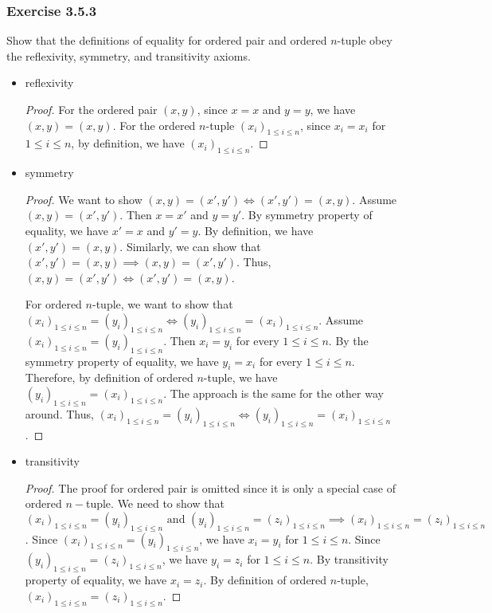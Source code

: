 \documentclass[12pt, letter]{article}
\begin{document}
\subsubsection*{Exercise 3.5.3}
Show that the definitions of equality for ordered pair and ordered $n$-tuple obey the reflexivity, symmetry, and transitivity axioms.
\begin{itemize}
    \item reflexivity
    \begin{proof}
        For the ordered pair $(x,y)$, since $x=x$ and $y=y$, we have $(x,y)=(x,y)$. 
        For the ordered $n$-tuple $(x_i)_{1\leq i\leq n}$, since $x_i=x_i$ for $1\leq i\leq n$, by definition, we have $(x_i)_{1\leq i\leq n}$.     
    \end{proof}  
    \item symmetry
    \begin{proof}
        We want to show $(x,y)=(x',y')\iff (x',y')=(x,y)$. Assume $(x,y)=(x',y')$. Then $x=x'$ and $y=y'$. By symmetry property of equality, we have 
        $x'=x$ and $y'=y$. By definition, we have $(x',y')=(x,y)$. Similarly, we can show that $(x',y')=(x,y)\implies (x,y)=(x',y')$.
        Thus, $(x,y)=(x',y')\iff (x',y')=(x,y)$.

        For ordered $n$-tuple, we want to show that $(x_i)_{1\leq i\leq n}=(y_i)_{1\leq i\leq n}\iff(y_i)_{1\leq i\leq n}= (x_i)_{1\leq i\leq n}$.
        Assume $(x_i)_{1\leq i\leq n}=(y_i)_{1\leq i\leq n}$. Then $x_i=y_i$ for every $1\leq i\leq n$. By the symmetry property of equality, we have 
        $y_i=x_i$ for every $1\leq i\leq n$. Therefore, by definition of ordered $n$-tuple, we have $(y_i)_{1\leq i\leq n}= (x_i)_{1\leq i\leq n}$. 
        The approach is the same for the other way around. Thus, $(x_i)_{1\leq i\leq n}=(y_i)_{1\leq i\leq n}\iff(y_i)_{1\leq i\leq n}= (x_i)_{1\leq i\leq n}$.
    \end{proof}  
    \item transitivity 
    \begin{proof}
        The proof for ordered pair is omitted since it is only a special case of ordered $n-$tuple. 
        We need to show that $(x_i)_{1\leq i\leq n}=(y_i)_{1\leq i\leq n}\text{ and } (y_i)_{1\leq i\leq n}=(z_i)_{1\leq i\leq n} \implies 
        (x_i)_{1\leq i\leq n}=(z_i)_{1\leq i\leq n}$. Since $(x_i)_{1\leq i\leq n}=(y_i)_{1\leq i\leq n}$, we have $x_i=y_i$ for $1\leq i\leq n$. 
        Since $(y_i)_{1\leq i\leq n}=(z_i)_{1\leq i\leq n}$, we have $y_i=z_i$ for $1\leq i\leq n$. By transitivity property of equality, we have $x_i=z_i$. 
        By definition of ordered $n$-tuple, $(x_i)_{1\leq i\leq n}=(z_i)_{1\leq i\leq n}$. 
    \end{proof}
\end{itemize}
\end{document}
